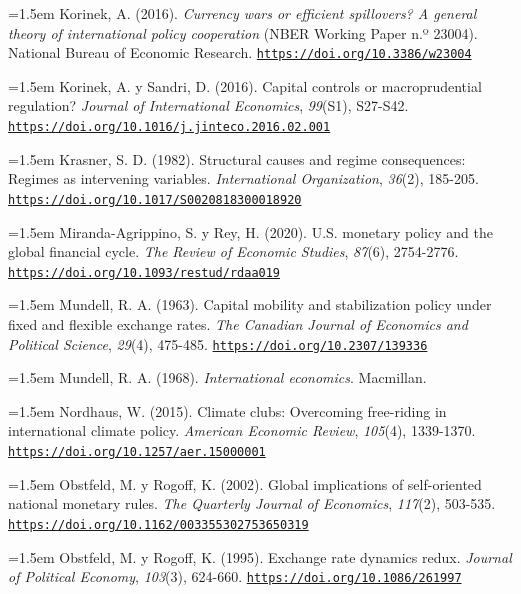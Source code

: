 \documentclass[10pt,a4paper]{article}
\begin{document}
\noindent\hangindent=1.5em Korinek, A. (2016). \textit{Currency wars or efficient spillovers? A general theory of international policy cooperation} (NBER Working Paper n.º 23004). National Bureau of Economic Research. \href{https://doi.org/10.3386/w23004}{\nolinkurl{https://doi.org/10.3386/w23004}}

\noindent\hangindent=1.5em Korinek, A. y Sandri, D. (2016). Capital controls or macroprudential regulation? \textit{Journal of International Economics}, \textit{99}(S1), S27-S42. \href{https://doi.org/10.1016/j.jinteco.2016.02.001}{\nolinkurl{https://doi.org/10.1016/j.jinteco.2016.02.001}}

\noindent\hangindent=1.5em Krasner, S. D. (1982). Structural causes and regime consequences: Regimes as intervening variables. \textit{International Organization}, \textit{36}(2), 185-205. \href{https://doi.org/10.1017/S0020818300018920}{\nolinkurl{https://doi.org/10.1017/S0020818300018920}}

\noindent\hangindent=1.5em Miranda-Agrippino, S. y Rey, H. (2020). U.S. monetary policy and the global financial cycle. \textit{The Review of Economic Studies}, \textit{87}(6), 2754-2776. \href{https://doi.org/10.1093/restud/rdaa019}{\nolinkurl{https://doi.org/10.1093/restud/rdaa019}}

\noindent\hangindent=1.5em Mundell, R. A. (1963). Capital mobility and stabilization policy under fixed and flexible exchange rates. \textit{The Canadian Journal of Economics and Political Science}, \textit{29}(4), 475-485. \href{https://doi.org/10.2307/139336}{\nolinkurl{https://doi.org/10.2307/139336}}

\noindent\hangindent=1.5em Mundell, R. A. (1968). \textit{International economics}. Macmillan.

\noindent\hangindent=1.5em Nordhaus, W. (2015). Climate clubs: Overcoming free-riding in international climate policy. \textit{American Economic Review}, \textit{105}(4), 1339-1370. \href{https://doi.org/10.1257/aer.15000001}{\nolinkurl{https://doi.org/10.1257/aer.15000001}}

\noindent\hangindent=1.5em Obstfeld, M. y Rogoff, K. (2002). Global implications of self-oriented national monetary rules. \textit{The Quarterly Journal of Economics}, \textit{117}(2), 503-535. \href{https://doi.org/10.1162/003355302753650319}{\nolinkurl{https://doi.org/10.1162/003355302753650319}}

\noindent\hangindent=1.5em Obstfeld, M. y Rogoff, K. (1995). Exchange rate dynamics redux. \textit{Journal of Political Economy}, \textit{103}(3), 624-660. \href{https://doi.org/10.1086/261997}{\nolinkurl{https://doi.org/10.1086/261997}}
\end{document}
